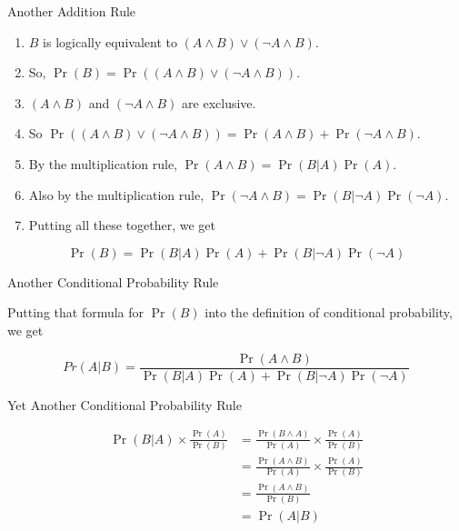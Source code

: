 \documentclass[
  ignorenonframetext,
]{beamer}
\providecommand{\tightlist}{%
  \setlength{\itemsep}{0pt}\setlength{\parskip}{0pt}}
\renewcommand{\,}{\text{, }}
\begin{document}
\begin{frame}{Another Addition Rule}
\protect\hypertarget{another-addition-rule}{}

\begin{enumerate}
\tightlist
\item
  \(B\) is logically equivalent to
  \((A \wedge B) \vee (\neg A \wedge B)\). \pause
\item
  So, \(\Pr(B) = \Pr((A \wedge B) \vee (\neg A \wedge B))\). \pause
\item
  \((A \wedge B)\) and \((\neg A \wedge B)\) are exclusive. \pause
\item
  So
  \(\Pr((A \wedge B) \vee (\neg A \wedge B)) = \Pr(A \wedge B) + \Pr(\neg A \wedge B)\).
  \pause
\item
  By the multiplication rule, \(\Pr(A \wedge B) = \Pr(B | A)\Pr(A)\).
  \pause
\item
  Also by the multiplication rule,
  \(\Pr(\neg A \wedge B) = \Pr(B | \neg A)\Pr(\neg A)\). \pause
\item
  Putting all these together, we get
\end{enumerate}

\[
\Pr(B) = \Pr(B | A)\Pr(A) + \Pr(B | \neg A)\Pr(\neg A)
\]

\end{frame}

\begin{frame}{Another Conditional Probability Rule}
\protect\hypertarget{another-conditional-probability-rule}{}

Putting that formula for \(\Pr(B)\) into the definition of conditional
probability, we get

\[
Pr(A | B) = \frac{\Pr(A \wedge B)}{\Pr(B | A)\Pr(A) + \Pr(B | \neg A)\Pr(\neg A)}
\]

\end{frame}

\begin{frame}{Yet Another Conditional Probability Rule}
\protect\hypertarget{yet-another-conditional-probability-rule}{}

\begin{align*}
\Pr(B | A) \times \frac{\Pr(A)}{\Pr(B)} &= \frac{\Pr(B \wedge A)}{\Pr(A)}  \times \frac{\Pr(A)}{\Pr(B)} \\
 &= \frac{\Pr(A \wedge B)}{\Pr(A)}  \times \frac{\Pr(A)}{\Pr(B)}  \\
 &= \frac{\Pr(A \wedge B)}{\Pr(B)} \\
 &= \Pr(A | B)
\end{align*}

\end{frame}
\end{document}
